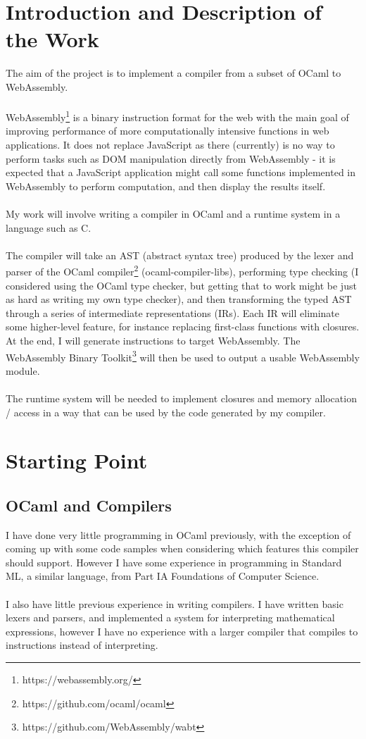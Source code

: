 \documentclass[12pt]{article}
\begin{document}
	\section*{Introduction and Description of the Work}
	The aim of the project is to implement a compiler from a subset of OCaml to WebAssembly.
	\\\\
	WebAssembly\footnote{https://webassembly.org/} is a binary instruction format for the web with the main goal of improving performance of more computationally intensive functions in web applications. It does not replace JavaScript as there (currently) is no way to perform tasks such as DOM manipulation directly from WebAssembly - it is expected that a JavaScript application might call some functions implemented in WebAssembly to perform computation, and then display the results itself.
	\\\\
	My work will involve writing a compiler in OCaml and a runtime system in a language such as C. 
	\\\\
	The compiler will take an AST (abstract syntax tree) produced by the lexer and parser of the OCaml compiler\footnote{https://github.com/ocaml/ocaml} (ocaml-compiler-libs), performing type checking (I considered using the OCaml type checker, but getting that to work might be just as hard as writing my own type checker), and then transforming the typed AST through a series of intermediate representations (IRs). Each IR will eliminate some higher-level feature, for instance replacing first-class functions with closures. At the end, I will generate instructions to target WebAssembly. The WebAssembly Binary Toolkit\footnote{https://github.com/WebAssembly/wabt} will then be used to output a usable WebAssembly module.
	\\\\
	The runtime system will be needed to implement closures and memory allocation / access in a way that can be used by the code generated by my compiler.
	
	\section*{Starting Point}
	\subsection*{OCaml and Compilers}
	I have done very little programming in OCaml previously, with the exception of coming up with some code samples when considering which features this compiler should support. However I have some experience in programming in Standard ML, a similar language, from Part IA Foundations of Computer Science.
	\\\\
	I also have little previous experience in writing compilers. I have written basic lexers and parsers, and implemented a system for interpreting mathematical expressions, however I have no experience with a larger compiler that compiles to instructions instead of interpreting.
	
\end{document}
